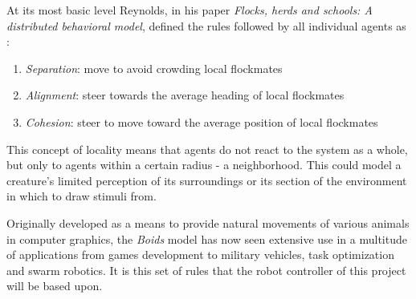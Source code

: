 At its most basic level Reynolds, in his paper \textit{Flocks, herds and schools: A distributed behavioral model}, defined the rules followed by all individual agents as \cite{Reynolds:1987:FHS:37402.37406}:

\begin{enumerate}
	\item \textit{Separation}: move to avoid crowding local flockmates
	\item \textit{Alignment}: steer towards the average heading of local flockmates
	\item \textit{Cohesion}: steer to move toward the average position of local flockmates
\end{enumerate}

This concept of locality means that agents do not react to the system as a whole, but only to agents within a certain radius - a neighborhood. This could model a creature’s limited perception of its surroundings or its section of the environment in which to draw stimuli from.

Originally developed as a means to provide natural movements of various animals in computer graphics,
the \textit{Boids} model has now seen extensive use in a multitude of applications from games development to military vehicles, task optimization and swarm robotics. It is this set of rules that the robot controller of this project will be based upon.